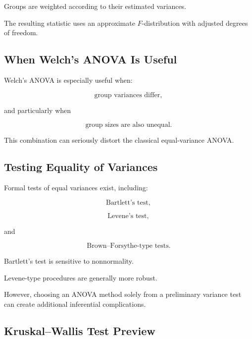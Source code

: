 Groups are weighted according to their estimated variances.

The resulting statistic uses an approximate \(F\)-distribution with
adjusted degrees of freedom.

\subsection{When Welch's ANOVA Is Useful}
\label{subsec:when-welch-anova}

Welch's ANOVA is especially useful when:

\[
\boxed{
\text{group variances differ},
}
\]

and particularly when

\[
\boxed{
\text{group sizes are also unequal}.
}
\]

This combination can seriously distort the classical equal-variance
ANOVA.

\subsection{Testing Equality of Variances}
\label{subsec:testing-equality-variances-anova}

Formal tests of equal variances exist, including:

\[
\boxed{
\text{Bartlett's test},
}
\]

\[
\boxed{
\text{Levene's test},
}
\]

and

\[
\boxed{
\text{Brown--Forsythe-type tests}.
}
\]

Bartlett's test is sensitive to nonnormality.

Levene-type procedures are generally more robust.

However, choosing an ANOVA method solely from a preliminary variance test
can create additional inferential complications.

\subsection{Kruskal--Wallis Test Preview}
\label{subsec:kruskal-wallis-preview}


